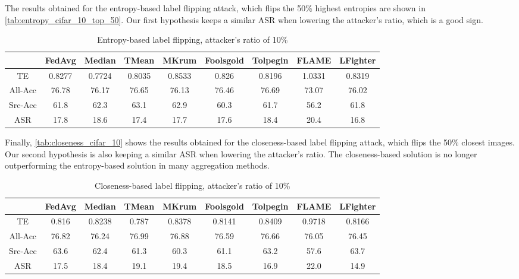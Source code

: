 The results obtained for the entropy-based label flipping attack, which flips the 50\% highest entropies are shown in \autoref{tab:entropy_cifar_10_top_50}. Our first hypothesis keeps a similar ASR when lowering the attacker's ratio, which is a good sign.
\begin{table}[h!]
    \centering
    \small
    \begin{adjustbox}{center}
    \begin{tabular}{|c|c|c|c|c|c|c|c|c|}
        \hline
        & FedAvg & Median & TMean & MKrum & Foolsgold & Tolpegin & FLAME & LFighter \\
        \hline
        TE & 0.8277 & 0.7724 & 0.8035 & 0.8533 & 0.826 & 0.8196 & 1.0331 & 0.8319 \\
        \hline
        All-Acc & 76.78 & 76.17 & 76.65 & 76.13 & 76.46 & 76.69 & 73.07 & 76.02 \\
        \hline
        Src-Acc & 61.8 & 62.3 & 63.1 & 62.9 & 60.3 & 61.7 & 56.2 & 61.8 \\
        \hline
        ASR & 17.8 & 18.6 & 17.4 & 17.7 & 17.6 & 18.4 & 20.4 & 16.8 \\
        \hline
    \end{tabular}
    \end{adjustbox}
    \caption{Entropy-based label flipping, attacker's ratio of 10\%}
    \label{tab:entropy_cifar_10_top_50}
\end{table}


Finally, \autoref{tab:closeness_cifar_10} shows the results obtained for the closeness-based label flipping attack, which flips the 50\% closest images. Our second hypothesis is also keeping a similar ASR when lowering the attacker's ratio. The closeness-based solution is no longer outperforming the entropy-based solution in many aggregation methods.

\begin{table}[h!]
    \centering
    \small
    \begin{adjustbox}{center}
    \begin{tabular}{|c|c|c|c|c|c|c|c|c|}
        \hline
        & FedAvg & Median & TMean & MKrum & Foolsgold & Tolpegin & FLAME & LFighter \\
        \hline
        TE & 0.816 & 0.8238 & 0.787 & 0.8378 & 0.8141 & 0.8409 & 0.9718 & 0.8166 \\
        \hline
        All-Acc & 76.82 & 76.24 & 76.99 & 76.88 & 76.59 & 76.66 & 76.05 & 76.45 \\
        \hline
        Src-Acc & 63.6 & 62.4 & 61.3 & 60.3 & 61.1 & 63.2 & 57.6 & 63.7 \\
        \hline
        ASR & 17.5 & 18.4 & 19.1 & 19.4 & 18.5 & 16.9 & 22.0 & 14.9 \\
        \hline
    \end{tabular}
    \end{adjustbox}
    \caption{Closeness-based label flipping, attacker's ratio of 10\%}
    \label{tab:closeness_cifar_10}
\end{table}

